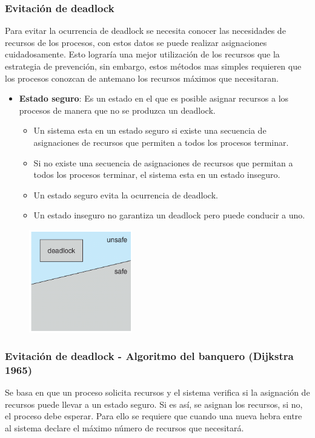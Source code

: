 \documentclass{templateNote}
\begin{document}
\subsubsection*{Evitación de deadlock}
Para evitar la ocurrencia de deadlock se necesita conocer las necesidades de recursos de los procesos, con estos datos se puede realizar asignaciones cuidadosamente.
Esto lograría una mejor utilización de los recursos que la estrategia de prevención, sin embargo, estos métodos mas simples requieren que los procesos conozcan de antemano los recursos máximos que necesitaran.

\begin{itemize}
    \item \textbf{Estado seguro}: Es un estado en el que es posible asignar recursos a los procesos de manera que no se produzca un deadlock.
    \begin{itemize}
        \item Un sistema esta en un estado seguro si existe una secuencia de asignaciones de recursos que permiten a todos los procesos terminar.
        \item Si no existe una secuencia de asignaciones de recursos que permitan a todos los procesos terminar, el sistema esta en un estado inseguro.
        \item Un estado seguro evita la ocurrencia de deadlock.
        \item Un estado inseguro no garantiza un deadlock pero puede conducir a uno.
    \end{itemize}
\end{itemize}
\begin{figure}[H]
    \centering
    \includegraphics[width=0.4\textwidth]{img/estadoSeguro.png}
\end{figure}


\subsubsection*{Evitación de deadlock - Algoritmo del banquero (Dijkstra 1965)}
Se basa en que un proceso solicita recursos y el sistema verifica si la asignación de recursos puede llevar a un estado seguro. Si es así, se asignan los recursos, si no, el proceso debe esperar. Para ello se requiere que cuando una nueva hebra entre al sistema declare el máximo número de recursos que necesitará.
\end{document}
